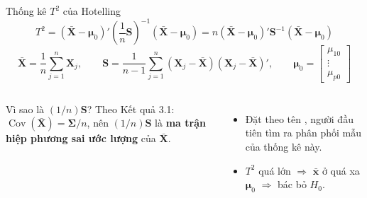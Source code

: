 \begin{frame}{Thống kê \texorpdfstring{\(T^2\)}{T2} của Hotelling}
  \vspace{-0.15cm}
  \begin{equation*}
    T^2
    = (\bar{\mathbf{X}}-\boldsymbol{\mu}_0)'
      \left(\frac{1}{n}\mathbf{S}\right)^{-1}
      (\bar{\mathbf{X}}-\boldsymbol{\mu}_0)
    = n(\bar{\mathbf{X}}-\boldsymbol{\mu}_0)'
      \mathbf{S}^{-1}
      (\bar{\mathbf{X}}-\boldsymbol{\mu}_0)
    \tag{5-4}
  \end{equation*}
  \vspace{-0.3cm}
  \small
  \[
    \bar{\mathbf{X}} = \frac{1}{n}\sum_{j=1}^{n}\mathbf{X}_j,
    \qquad
    \mathbf{S}
    = \frac{1}{n-1}\sum_{j=1}^{n}
      (\mathbf{X}_j-\bar{\mathbf{X}})(\mathbf{X}_j-\bar{\mathbf{X}})',
    \qquad
    \boldsymbol{\mu}_0 =
    \begin{bmatrix}
      \mu_{10} \\ \vdots \\ \mu_{p0}
    \end{bmatrix}
  \]
  \vspace{-0.1cm}
  \begin{columns}[T,onlytextwidth]
    \begin{block}{Vì sao là \((1/n)\mathbf{S}\)?}
      Theo Kết quả 3.1: \(\operatorname{Cov}(\bar{\mathbf{X}})=\boldsymbol{\Sigma}/n\),
      nên \((1/n)\mathbf{S}\) là \textbf{ma trận hiệp phương sai ước lượng} của \(\bar{\mathbf{X}}\).
    \end{block}
    \begin{itemize}\setlength{\itemsep}{3pt}
      \item Đặt theo tên , người đầu tiên tìm ra phân phối mẫu của thống kê này.
      \item \(T^2\) quá lớn \(\Rightarrow\) \(\bar{\mathbf{x}}\) ở quá xa \(\boldsymbol{\mu}_0\) \(\Rightarrow\) bác bỏ \(H_0\).
    \end{itemize}
  \end{columns}
\end{frame}

